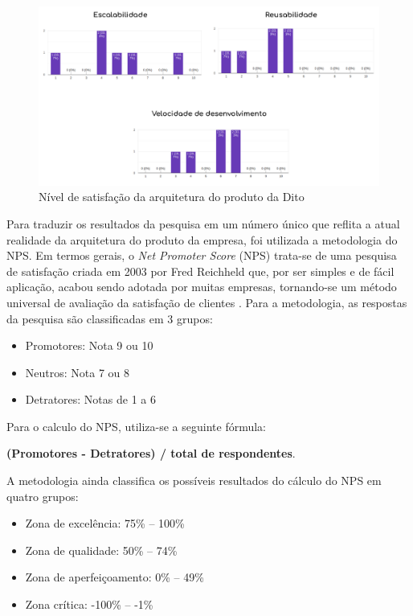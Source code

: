 \begin{figure}
  \begin{center}
	  \includegraphics[width=\linewidth]{./04-figuras/08_avaliacao_resultados/product-metrics.png}
	\end{center}
  \caption{Nível de satisfação da arquitetura do produto da Dito}
  \label{fig:productMetrics}
\end{figure}

Para traduzir os resultados da pesquisa em um número único que reflita a atual realidade da arquitetura do produto da empresa, foi utilizada a metodologia do NPS. Em termos gerais, o \textit{Net Promoter Score} (NPS) trata-se de uma pesquisa de satisfação criada em 2003 por Fred Reichheld que, por ser simples e de fácil aplicação, acabou sendo adotada por muitas empresas, tornando-se um método universal de avaliação da satisfação de clientes \cite{nps}. Para a metodologia, as respostas da pesquisa são classificadas em 3 grupos:

\begin{itemize}
  \item Promotores: Nota 9 ou 10
  \item Neutros: Nota 7 ou 8
  \item Detratores: Notas de 1 a 6
\end{itemize}

Para o calculo do NPS, utiliza-se a seguinte fórmula:
\begin{center}
  \textbf{(Promotores - Detratores) / total de respondentes}.    
\end{center}{}

A metodologia ainda classifica os possíveis resultados do cálculo do NPS em quatro grupos:

\begin{itemize}
  \item Zona de excelência: 75\% -- 100\%
  \item Zona de qualidade: 50\% -- 74\%
  \item Zona de aperfeiçoamento: 0\% -- 49\%
  \item Zona crítica: -100\% -- -1\%
\end{itemize}

